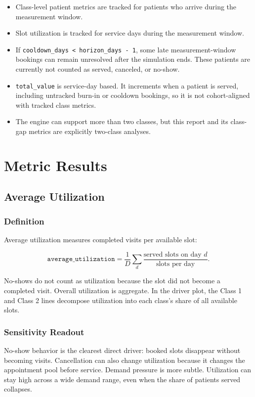 \documentclass[11pt]{article}
\begin{document}
\begin{itemize}
    \item Class-level patient metrics are tracked for patients who arrive during the measurement window.
    \item Slot utilization is tracked for service days during the measurement window.
    \item If \texttt{cooldown\_days < horizon\_days - 1}, some late measurement-window bookings can remain unresolved after the simulation ends. These patients are currently not counted as served, canceled, or no-show.
    \item \texttt{total\_value} is service-day based. It increments when a patient is served, including untracked burn-in or cooldown bookings, so it is not cohort-aligned with tracked class metrics.
    \item The engine can support more than two classes, but this report and its class-gap metrics are explicitly two-class analyses.
\end{itemize}

\section{Metric Results}

\subsection{Average Utilization}

\subsubsection*{Definition}

Average utilization measures completed visits per available slot:

\[
\texttt{average\_utilization} =
\frac{1}{D}\sum_d \frac{\text{served slots on day } d}{\text{slots per day}}.
\]

No-shows do not count as utilization because the slot did not become a completed visit. Overall utilization is aggregate. In the driver plot, the Class 1 and Class 2 lines decompose utilization into each class's share of all available slots.

\subsubsection*{Sensitivity Readout}

No-show behavior is the clearest direct driver: booked slots disappear without becoming visits. Cancellation can also change utilization because it changes the appointment pool before service. Demand pressure is more subtle. Utilization can stay high across a wide demand range, even when the share of patients served collapses.
\end{document}
